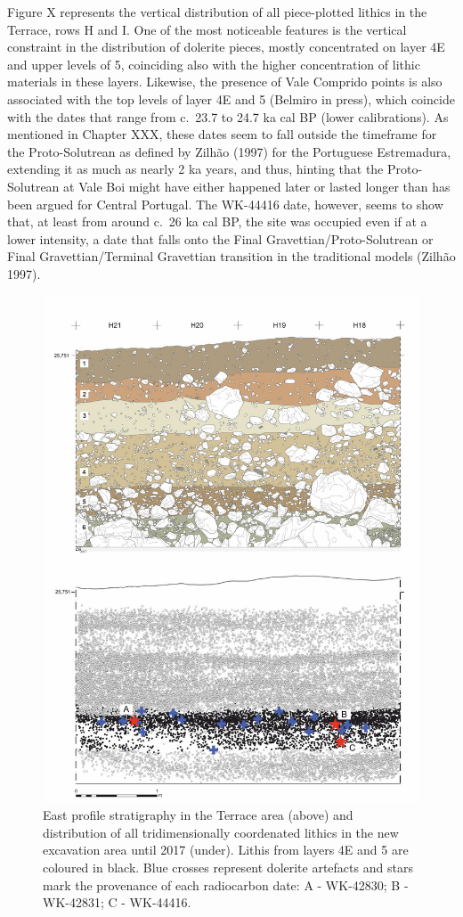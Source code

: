 \documentclass[12pt,twoside]{reedthesis}
\begin{document}
Figure X represents the vertical distribution of all piece-plotted lithics in the Terrace, rows H and I. One of the most noticeable features is the vertical constraint in the distribution of dolerite pieces, mostly concentrated on layer 4E and upper levels of 5, coinciding also with the higher concentration of lithic materials in these layers. Likewise, the presence of Vale Comprido points is also associated with the top levels of layer 4E and 5 (Belmiro in press), which coincide with the dates that range from c.~23.7 to 24.7 ka cal BP (lower calibrations). As mentioned in Chapter XXX, these dates seem to fall outside the timeframe for the Proto-Solutrean as defined by Zilhão (1997) for the Portuguese Estremadura, extending it as much as nearly 2 ka years, and thus, hinting that the Proto-Solutrean at Vale Boi might have either happened later or lasted longer than has been argued for Central Portugal. The WK-44416 date, however, seems to show that, at least from around c.~26 ka cal BP, the site was occupied even if at a lower intensity, a date that falls onto the Final Gravettian/Proto-Solutrean or Final Gravettian/Terminal Gravettian transition in the traditional models (Zilhão 1997).
\begin{figure}
\includegraphics[width=1\linewidth]{figure/SpatialanalysisVB} \caption{East profile stratigraphy in the Terrace area (above) and distribution of all tridimensionally coordenated lithics in the new excavation area until 2017 (under). Lithis from layers 4E and 5 are coloured in black. Blue crosses represent dolerite artefacts and stars mark the provenance of each radiocarbon date: A - WK-42830; B - WK-42831; C - WK-44416.}\label{fig:spatialvbfig}
\end{figure}
\end{document}
